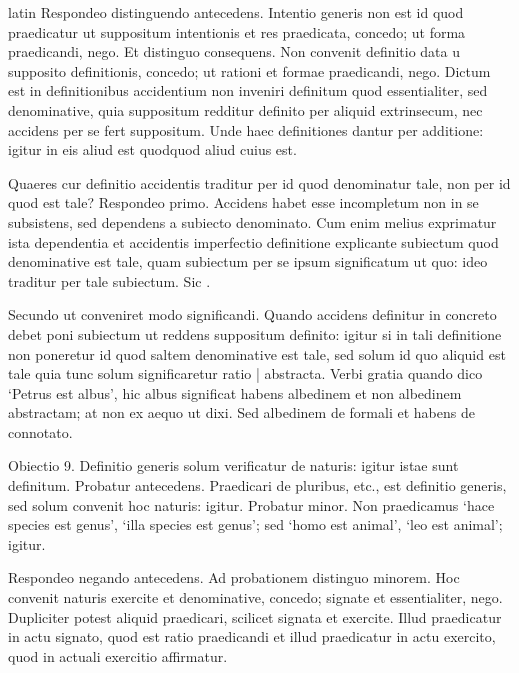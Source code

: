 \begin{otherlanguage*}{latin}
\pstart
Respondeo distinguendo antecedens. Intentio generis non est id quod praedicatur ut suppositum intentionis et res praedicata, concedo; ut forma praedicandi, nego. Et distinguo consequens. Non convenit definitio data u supposito definitionis, concedo; ut rationi et formae praedicandi, nego. Dictum est in definitionibus accidentium non inveniri definitum quod essentialiter, sed denominative, quia suppositum redditur definito per aliquid extrinsecum, nec accidens per se fert suppositum. Unde haec definitiones dantur per additione:
igitur in eis aliud est quodquod aliud cuius est. 
\pend

\pstart
Quaeres cur definitio accidentis traditur per id quod denominatur tale, non per id quod est tale? Respondeo primo. Accidens habet esse incompletum non in se subsistens, sed dependens a subiecto denominato. Cum enim melius exprimatur ista dependentia et accidentis imperfectio definitione explicante subiectum quod denominative est tale, quam subiectum per se ipsum significatum ut quo:
ideo traditur per tale subiectum. Sic . 
\pend

\pstart
Secundo ut conveniret modo significandi. Quando accidens definitur in concreto debet poni subiectum ut reddens suppositum definito:
igitur si in tali definitione non poneretur id quod saltem denominative est tale, sed solum id quo aliquid est tale quia tunc solum significaretur ratio \textnormal{|} abstracta. Verbi gratia quando dico `Petrus est albus', hic albus significat habens albedinem et non albedinem abstractam; at non ex aequo ut dixi. Sed albedinem de formali et habens de connotato. 
\pend

\pstart
Obiectio 9. Definitio generis solum verificatur de naturis:
igitur istae sunt definitum. Probatur antecedens. Praedicari de pluribus, etc., est definitio generis, sed solum convenit hoc naturis:
igitur. Probatur minor. Non praedicamus `hace species est genus', `illa species est genus'; sed `homo est animal', `leo est animal'; igitur. 
\pend

\pstart
Respondeo negando antecedens. Ad probationem distinguo minorem. Hoc convenit naturis exercite et denominative, concedo; signate et essentialiter, nego. Dupliciter potest aliquid praedicari, scilicet signata et exercite. Illud praedicatur in actu signato, quod est ratio praedicandi et illud praedicatur in actu exercito, quod in actuali exercitio affirmatur. 
\pend


\end{otherlanguage*}
